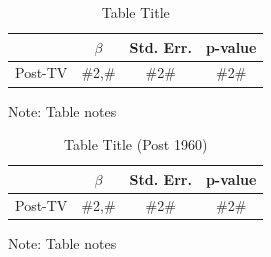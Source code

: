 \noindent 
\begin{table}[H]
\caption{Table Title\label{tab:regression}}
\medskip{}

\begin{centering}
\begin{tabular}{cccc}
\hline 
 & $\beta$ & Std. Err. & p-value\tabularnewline
\hline 
Post-TV & \#2,\# & \#2\# & \#2\#\tabularnewline
\hline 
\end{tabular}
\par\end{centering}
\begin{centering}
\medskip{}
\par\end{centering}
{\footnotesize{}Note: Table notes}{\footnotesize\par}
\end{table}

\begin{table}[H]
\caption{Table Title (Post 1960)\label{tab:regression_post1960}}
\medskip{}

\begin{centering}
\begin{tabular}{cccc}
\hline 
 & $\beta$ & Std. Err. & p-value\tabularnewline
\hline 
Post-TV & \#2,\# & \#2\# & \#2\#\tabularnewline
\hline 
\end{tabular}
\par\end{centering}
\begin{centering}
\medskip{}
\par\end{centering}
{\footnotesize{}Note: Table notes}{\footnotesize\par}
\end{table}

